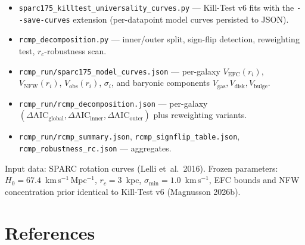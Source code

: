 \documentclass[11pt,a4paper]{article}
\begin{document}
\begin{itemize}[leftmargin=2em,itemsep=2pt]
  \item \texttt{sparc175\_killtest\_universality\_curves.py} ---
    Kill-Test v6 fits with the \texttt{-{}-save-curves} extension
    (per-datapoint model curves persisted to JSON).
  \item \texttt{rcmp\_decomposition.py} ---
    inner/outer split, sign-flip detection, reweighting test,
    $r_c$-robustness scan.
  \item \texttt{rcmp\_run/sparc175\_model\_curves.json} ---
    per-galaxy $V_{\text{EFC}}(r_i)$, $V_{\text{NFW}}(r_i)$,
    $V_{\text{obs}}(r_i)$, $\sigma_i$, and baryonic components
    $V_{\text{gas}}, V_{\text{disk}}, V_{\text{bulge}}$.
  \item \texttt{rcmp\_run/rcmp\_decomposition.json} ---
    per-galaxy
    $(\Delta\text{AIC}_{\text{global}},\Delta\text{AIC}_{\text{inner}},\Delta\text{AIC}_{\text{outer}})$
    plus reweighting variants.
  \item \texttt{rcmp\_run/rcmp\_summary.json},
        \texttt{rcmp\_signflip\_table.json},
        \texttt{rcmp\_robustness\_rc.json} --- aggregates.
\end{itemize}
Input data: SPARC rotation curves (Lelli et~al.\ 2016).  Frozen
parameters: $H_0=67.4$~km\,s$^{-1}$\,Mpc$^{-1}$, $r_c=3$~kpc,
$\sigma_{\min}=1.0$~km\,s$^{-1}$, EFC bounds and NFW concentration prior
identical to Kill-Test v6 (Magnusson 2026b).

\section*{References}
\end{document}
